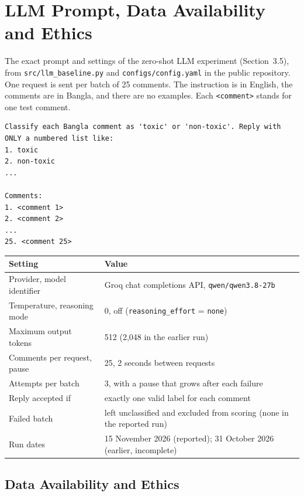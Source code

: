 \chapter{LLM Prompt, Data Availability and Ethics}
\label{app:prompt}
\justifying

The exact prompt and settings of the zero-shot LLM experiment (Section~3.5), from \texttt{src/llm\_baseline.py} and \texttt{configs/config.yaml} in the public repository. One request is sent per batch of 25 comments. The instruction is in English, the comments are in Bangla, and there are no examples. Each \texttt{<comment>} stands for one test comment.

\begin{verbatim}
Classify each Bangla comment as 'toxic' or 'non-toxic'. Reply with
ONLY a numbered list like:
1. toxic
2. non-toxic
...

Comments:
1. <comment 1>
2. <comment 2>
...
25. <comment 25>
\end{verbatim}

\begin{table}[H]
  \centering
  \small
  \begin{tabular}{ll}
    \toprule
    \textbf{Setting} & \textbf{Value} \\
    \midrule
    Provider, model identifier & Groq chat completions API, \texttt{qwen/qwen3.8-27b} \\
    Temperature, reasoning mode & 0, off (\texttt{reasoning\_effort} = \texttt{none}) \\
    Maximum output tokens & 512 (2,048 in the earlier run) \\
    Comments per request, pause & 25, 2 seconds between requests \\
    Attempts per batch & 3, with a pause that grows after each failure \\
    Reply accepted if & exactly one valid label for each comment \\
    Failed batch & left unclassified and excluded from scoring (none in the reported run) \\
    Run dates & 15 November 2026 (reported); 31 October 2026 (earlier, incomplete) \\
    \bottomrule
  \end{tabular}
\end{table}

\section*{Data Availability and Ethics}

